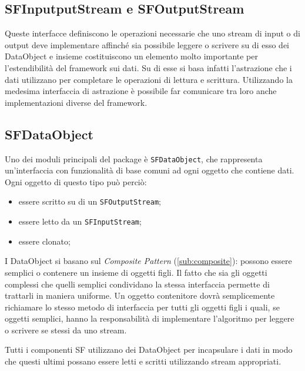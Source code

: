 \subsection{SFInputputStream e SFOutputStream}
\label{sub:sfinoutstream}
Queste interfacce definiscono le operazioni necessarie che uno stream di input o di output deve implementare affinch\'e sia possibile leggere o scrivere su di esso dei DataObject e insieme costituiscono un elemento molto importante per l'estendibilit\`a del framework sui dati. Su di esse si basa infatti l'astrazione che i dati utilizzano per completare le operazioni di lettura e scrittura. Utilizzando la medesima interfaccia di astrazione \`e possibile far comunicare tra loro anche implementazioni diverse del framework.

\subsection{SFDataObject}
\label{sub:sfdataobject}
Uno dei moduli principali del package \`e \texttt{SFDataObject}, che rappresenta un'interfaccia con funzionalit\`a di base comuni ad ogni oggetto che contiene dati. 
Ogni oggetto di questo tipo pu\`o perci\`o:
\begin{itemize}
	\item essere scritto su di un \texttt{SFOutputStream};
	\item essere letto da un \texttt{SFInputStream};
	\item essere clonato;
\end{itemize}
I DataObject si basano sul \textit{Composite Pattern} (\ref{sub:composite}): possono essere semplici o contenere un insieme di oggetti figli. Il fatto che sia gli oggetti complessi che quelli semplici condividano la stessa interfaccia permette di trattarli in maniera uniforme. Un oggetto contenitore dovr\`a semplicemente richiamare lo stesso metodo di interfaccia per tutti gli oggetti figli i quali, se oggetti semplici, hanno la responsabilit\`a di implementare l'algoritmo per leggere o scrivere se stessi da uno stream.

Tutti i componenti SF utilizzano dei DataObject per incapsulare i dati in modo che questi ultimi possano essere letti e scritti utilizzando stream appropriati.

